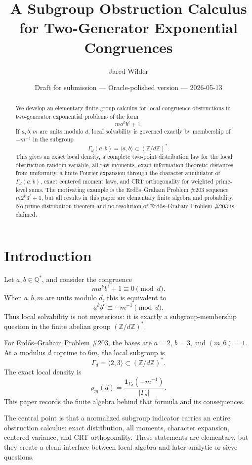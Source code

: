 \documentclass[11pt]{article}
\title{A Subgroup Obstruction Calculus for Two-Generator Exponential Congruences}
\author{Jared Wilder}
\date{Draft for submission --- Oracle-polished version --- 2026-05-13}
\newcommand{\Z}{\mathbb Z}
\newcommand{\Q}{\mathbb Q}
\newcommand{\1}{\mathbf 1}
\begin{document}
\maketitle

\begin{abstract}
We develop an elementary finite-group calculus for local congruence obstructions in two-generator exponential problems of the form
\[
m a^k b^\ell+1.
\]
If \(a,b,m\) are units modulo \(d\), local solvability is governed exactly by membership of \(-m^{-1}\) in the subgroup
\[
\Gamma_d(a,b)=\langle a,b\rangle\subset(\Z/d\Z)^*.
\]
This gives an exact local density, a complete two-point distribution law for the local obstruction random variable, all raw moments, exact information-theoretic distances from uniformity, a finite Fourier expansion through the character annihilator of \(\Gamma_d(a,b)\), exact centered moment laws, and CRT orthogonality for weighted prime-level sums.  The motivating example is the Erd\H{o}s--Graham Problem \#203 sequence \(m2^k3^\ell+1\), but all results in this paper are elementary finite algebra and probability.  No prime-distribution theorem and no resolution of Erd\H{o}s--Graham Problem \#203 is claimed.
\end{abstract}

\section{Introduction}

Let \(a,b\in\Q^*\), and consider the congruence
\[
m a^k b^\ell+1\equiv0\pmod d.
\]
When \(a,b,m\) are units modulo \(d\), this is equivalent to
\[
a^k b^\ell\equiv -m^{-1}\pmod d.
\]
Thus local solvability is not mysterious: it is exactly a subgroup-membership question in the finite abelian group \((\Z/d\Z)^*\).

For Erd\H{o}s--Graham Problem \#203, the bases are \(a=2\), \(b=3\), and \((m,6)=1\).  At a modulus \(d\) coprime to \(6m\), the local subgroup is
\[
\Gamma_d=\langle2,3\rangle\subset(\Z/d\Z)^*.
\]
The exact local density is
\[
\rho_m(d)=\frac{\1_{\Gamma_d}(-m^{-1})}{|\Gamma_d|}.
\]
This paper records the finite algebra behind that formula and its consequences.

The central point is that a normalized subgroup indicator carries an entire obstruction calculus: exact distribution, all moments, character expansion, centered variance, and CRT orthogonality.  These statements are elementary, but they create a clean interface between local algebra and later analytic or sieve questions.
\end{document}
